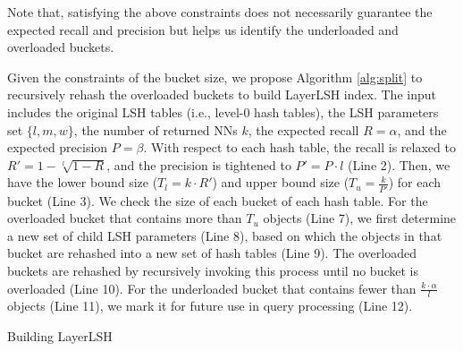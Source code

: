 Note that, satisfying the above constraints does not necessarily guarantee the expected recall and precision but helps us identify the underloaded and overloaded buckets.

Given the constraints of the bucket size, we propose Algorithm \ref{alg:split} to recursively rehash the overloaded buckets to build LayerLSH index. The input includes the original LSH tables (i.e., level-0 hash tables), the LSH parameters set $\{l,m,w\}$, the number of returned NNs $k$, the expected recall $R=\alpha$, and the expected precision $P=\beta$. With respect to each hash table, the recall is relaxed to $R'=1-\sqrt[l]{1-R}$, and the precision is tightened to $P'=P\cdot l$ (Line 2). Then, we have the lower bound size ($T_l=k\cdot R'$) and upper bound size ($T_u=\frac{k}{P'}$) for each bucket (Line 3). We check the size of each bucket of each hash table. For the overloaded bucket that contains more than $T_u$ objects (Line 7), we first determine a new set of child LSH parameters (Line 8), based on which the objects in that bucket are rehashed into a new set of hash tables (Line 9). The overloaded buckets are rehashed by recursively invoking this process until no bucket is overloaded (Line 10). For the underloaded bucket that contains fewer than $\frac{k\cdot\alpha}{l}$ objects (Line 11), we mark it for future use in query processing (Line 12).

\SetAlFnt{\small\sffamily}
\SetInd{0.55em}{0.5em}
\setlength{\textfloatsep}{0pt}
\begin{algorithm}[t]
\SetNoFillComment
{}
\SetAlgoNoLine

\BlankLine
{}
\caption{Building LayerLSH}
\label{alg:split}
\end{algorithm}

